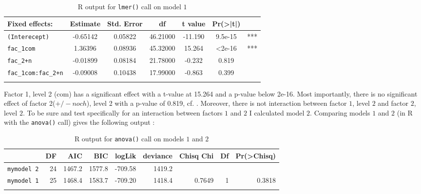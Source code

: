 \documentclass[output=paper,
modfonts
]{langscibook}
\begin{document}
\begin{table}
\begin{tabular}{lS[table-format=-1.5]S[table-format=1.5]S[table-format=2.5]S[table-format=-2.3]S[table-format=<1.1e3]l}
\lsptoprule
Fixed effects:    & {Estimate} & {Std. Error} & {df}        & {t value}   & {Pr(>|t|)}  & \\\midrule
\texttt{(Interecept)}        & -0.65142 & 0.05822 & 46.21000 & -11.190  & 9.5e-15   & {***}\\
\texttt{fac\_1com}           & 1.36396  & 0.08936 & 45.32000 & 15.264   & <2e-16   & {***}\\
\texttt{fac\_2+n}            & -0.01899 & 0.08184 & 21.78000 & -0.232   & 0.819     & \\
\texttt{fac\_1com:fac\_2+n}  & -0.09008 & 0.10438 & 17.99000 & -0.863   & 0.399     & \\\lspbottomrule
\end{tabular}
\caption{R output for \texttt{lmer()} call on model $1$ }
\label{R_output_model_1}
\end{table}

\noindent Factor 1, level 2 (com) has a significant effect with a t-value at 15.264 and a p-value below 2e-16. Most importantly, there is no significant effect of factor 2($+/-noch$), level 2 with a p-value of 0.819, cf. . Moreover, there is not interaction between factor $1$, level $2$ and factor $2$, level $2$. To be sure and test specifically for an interaction between factors $1$ and $2$ I calculated model $2$. Comparing models $1$ and $2$ (in R with the \texttt{anova()} call) gives the following output \citep[cf.][]{winter2013}:

\begin{table}
\begin{tabular}{lrrrrrrrr}
\lsptoprule
                    & {DF} & {AIC}    & {BIC}    & {logLik}  & {deviance} & {Chisq Chi} & {Df} & {Pr(>Chisq)} \\\midrule
\texttt{mymodel 2}  & {24} & {1467.2} & {1577.8} & {-709.58} & {1419.2}   &               &        &                \\
\texttt{mymodel 1}  & {25} & {1468.4} & {1583.7} & {-709.20} & {1418.4}   & {0.7649}    & {1}  & {0.3818}     \\\lspbottomrule
\caption{R output for \texttt{anova()} call on models $1$ and $2$}
\label{R_output_anova_model_1_and_2}
\end{tabular}
\end{table}
\end{document}

